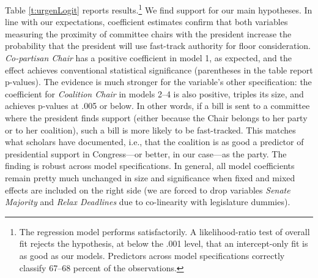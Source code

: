 \documentclass[letter,12pt]{article}
\begin{document}
Table \ref{t:urgenLogit} reports results.\footnote{The regression model performs satisfactorily. A likelihood-ratio test of overall fit rejects the hypothesis, at below the .001 level, that an intercept-only fit is as good as our models. Predictors across model specifications correctly classify 67--68 percent of the observations.} We find support for our main hypotheses. In line with our expectations, coefficient estimates confirm that both variables measuring the proximity of committee chairs with the president increase the probability that the president will use fast-track authority for floor consideration. \emph{Co-partisan Chair} has a positive coefficient in model 1, as expected, and the effect achieves conventional statistical significance (parentheses in the table report p-values). The evidence is much stronger for the variable's other specification: the coefficient for \emph{Coalition Chair} in models 2--4 is also positive, triples its size, and achieves p-values at .005 or below. In other words, if a bill is sent to a committee where the president finds support (either because the Chair belongs to her party or to her coalition), such a bill is more likely to be fast-tracked. This matches what scholars have documented, i.e., that the coalition is as good a predictor of presidential support in Congress---or better, in our case---as the party. The finding is robust across model specifications. In general, all model coefficients remain pretty much unchanged in size and significance when fixed and mixed effects are included on the right side (we are forced to drop variables \emph{Senate Majority} and \emph{Relax Deadlines} due to co-linearity with legislature dummies). 

\end{document}
